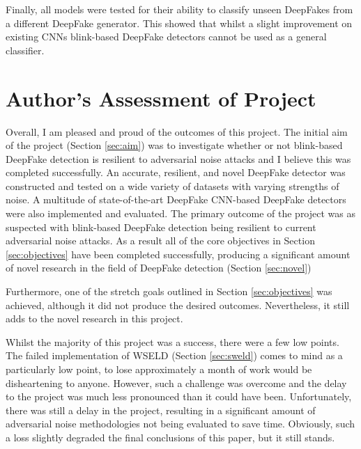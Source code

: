 Finally, all models were tested for their ability to classify unseen DeepFakes from a different DeepFake generator. This showed that whilst a slight improvement on existing CNNs blink-based DeepFake detectors cannot be used as a general classifier.

\section{Author's Assessment of Project}


Overall, I am pleased and proud of the outcomes of this project. The initial aim of the project (Section \ref{sec:aim}) was to investigate whether or not blink-based DeepFake detection is resilient to adversarial noise attacks and I believe this was completed successfully. An accurate, resilient, and novel DeepFake detector was constructed and tested on a wide variety of datasets with varying strengths of noise. A multitude of state-of-the-art DeepFake CNN-based DeepFake detectors were also implemented and evaluated. The primary outcome of the project was as suspected with blink-based DeepFake detection being resilient to current adversarial noise attacks. As a result all of the core objectives in Section \ref{sec:objectives} have been completed successfully, producing a significant amount of novel research in the field of DeepFake detection (Section \ref{sec:novel})

Furthermore, one of the stretch goals outlined in Section \ref{sec:objectives} was achieved, although it did not produce the desired outcomes. Nevertheless, it still adds to the novel research in this project. 

Whilst the majority of this project was a success, there were a few low points. The failed implementation of WSELD (Section \ref{sec:sweld}) comes to mind as a particularly low point, to lose approximately a month of work would be disheartening to anyone. However, such a challenge was overcome and the delay to the project was much less pronounced than it could have been. Unfortunately, there was still a delay in the project, resulting in a significant amount of adversarial noise methodologies not being evaluated to save time. Obviously, such a loss slightly degraded the final conclusions of this paper, but it still stands.

